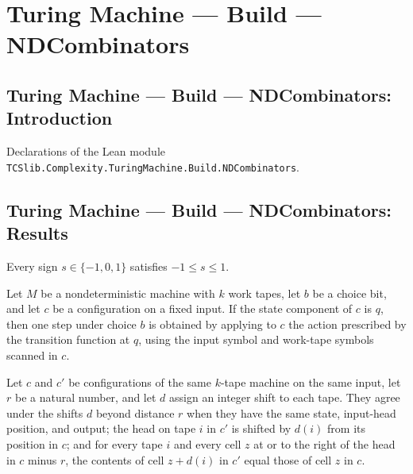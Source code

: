 \section{Turing Machine --- Build --- NDCombinators}
\subsection*{Turing Machine --- Build --- NDCombinators: Introduction}

Declarations of the Lean module \texttt{TCSlib.Complexity.TuringMachine.Build.NDCombinators}.

\subsection*{Turing Machine --- Build --- NDCombinators: Results}

\begin{theorem}
\label{Turing.signType_bounds}
\leanok
{}
Every sign $s\in\{-1,0,1\}$ satisfies $-1\le s\le 1$.
\end{theorem}

\begin{theorem}
\label{Turing.NDTM.stepWith_of_state}
\leanok
{}
Let $M$ be a nondeterministic machine with $k$ work tapes, let $b$ be a choice bit, and
let $c$ be a configuration on a fixed input. If the state component of $c$ is $q$, then
one step under choice $b$ is obtained by applying to $c$ the action prescribed by the
transition function at $q$, using the input symbol and work-tape symbols scanned in $c$.
\end{theorem}

\begin{definition}
\label{Turing.NDTM.AgreeShift}
\leanok
{}
Let $c$ and $c'$ be configurations of the same $k$-tape machine on the same input, let
$r$ be a natural number, and let $d$ assign an integer shift to each tape. They agree
under the shifts $d$ beyond distance $r$ when they have the same state, input-head
position, and output; the head on tape $i$ in $c'$ is shifted by $d(i)$ from its
position in $c$; and for every tape $i$ and every cell $z$ at or to the right of the
head in $c$ minus $r$, the contents of cell $z+d(i)$ in $c'$ equal those of cell $z$ in
$c$.
\end{definition}

